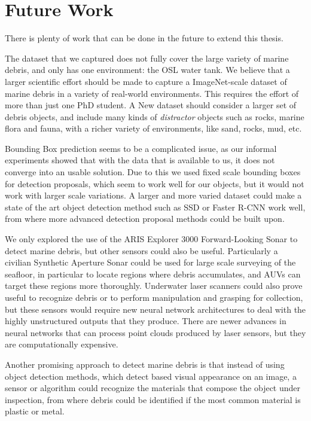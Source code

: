 \section{Future Work}

There is plenty of work that can be done in the future to extend this thesis.

The dataset that we captured does not fully cover the large variety of marine debris, and only has one environment: the OSL water tank. We believe that a larger scientific effort should be made to capture a ImageNet-scale dataset of marine debris in a variety of real-world environments. This requires the effort of more than just one PhD student. A New dataset should consider a larger set of debris objects, and include many kinds of \textit{distractor} objects such as rocks, marine flora and fauna, with a richer variety of environments, like sand, rocks, mud, etc.

Bounding Box prediction seems to be a complicated issue, as our informal experiments showed that with the data that is available to us, it does not converge into an usable solution. Due to this we used fixed scale bounding boxes for detection proposals, which seem to work well for our objects, but it would not work with larger scale variations. A larger and more varied dataset could make a state of the art object detection method such as SSD or Faster R-CNN work well, from where more advanced detection proposal methods could be built upon.

We only explored the use of the ARIS Explorer 3000 Forward-Looking Sonar to detect marine debris, but other sensors could also be useful. Particularly a civilian Synthetic Aperture Sonar could be used for large scale surveying of the seafloor, in particular to locate regions where debris accumulates, and AUVs can target these regions more thoroughly.
Underwater laser scanners could also prove useful to recognize debris or to perform manipulation and grasping for collection, but these sensors would require new neural network architectures to deal with the highly unstructured outputs that they produce. There are newer advances in neural networks\cite{qi2017pointnet} that can process point clouds produced by laser sensors, but they are computationally expensive.

Another promising approach to detect marine debris is that instead of using object detection methods, which detect based visual appearance on an image, a sensor or algorithm could recognize the materials that compose the object under inspection, from where debris could be identified if the most common material is plastic or metal.

